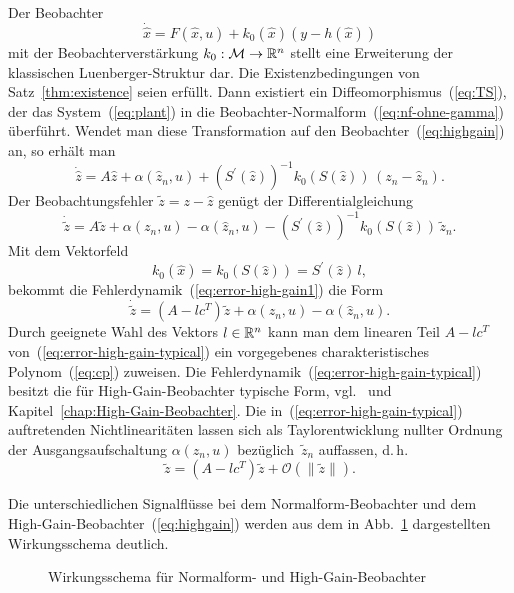 Der Beobachter 
\begin{equation}
\dot{\hat{x}}=F(\hat{x},u)+k_{0}(\hat{x})(y-h(\hat{x}))\label{eq:highgain}
\end{equation}
mit der Beobachterverstärkung $k_{0}:\mathcal{M}\to{\mathbb{R}}^{n}$ stellt
eine Erweiterung der klassischen Luenberger-Struktur dar. Die Existenzbedingungen
von Satz~\ref{thm:existence} seien erfüllt. Dann existiert ein Diffeomorphismus~(\ref{eq:TS}),
der das System~(\ref{eq:plant}) in die Beobachter-Normalform~(\ref{eq:nf-ohne-gamma})
überführt. Wendet man diese Transformation auf den Beobachter~(\ref{eq:highgain})
an, so erhält man 
\[
\dot{\hat{z}}=A\hat{z}+\alpha(\hat{z}_{n},u)+\left(S^{\prime}(\hat{z})\right)^{-1}k_{0}(S(\hat{z}))\,(z_{n}-\hat{z}_{n}).
\]
Der Beobachtungsfehler $\tilde{z}=z-\hat{z}$ genügt der Differentialgleichung
\begin{equation}
\dot{\tilde{z}}=A\tilde{z}+\alpha(z_{n},u)-\alpha(\hat{z}_{n},u)-\left(S^{\prime}(\hat{z})\right)^{-1}k_{0}(S(\hat{z}))\,\tilde{z}_{n}.\label{eq:error-high-gain1}
\end{equation}
Mit dem Vektorfeld 
\begin{equation}
k_{0}(\hat{x})=k_{0}(S(\hat{z}))=S^{\prime}(\hat{z})\,l,\label{eq:gain-hg-z}
\end{equation}
bekommt die Fehlerdynamik~(\ref{eq:error-high-gain1}) die Form 
\begin{equation}
\dot{\tilde{z}}=(A-lc^{T})\tilde{z}+\alpha(z_{n},u)-\alpha(\hat{z}_{n},u).\label{eq:error-high-gain-typical}
\end{equation}
Durch geeignete Wahl des Vektors $l\in{\mathbb{R}}^{n}$ kann man dem linearen
Teil $A-lc^{T}$ von~(\ref{eq:error-high-gain-typical}) ein vorgegebenes
charakteristisches Polynom~(\ref{eq:cp}) zuweisen. Die Fehlerdynamik~(\ref{eq:error-high-gain-typical})
besitzt die für High-Gain-Beobachter typische Form, vgl.~\cite{thau1973,raghavan1994,rajamani1998}
und Kapitel~\ref{chap:High-Gain-Beobachter}. Die in~(\ref{eq:error-high-gain-typical})
auftretenden Nichtlinearitäten lassen sich als Taylorentwicklung nullter
Ordnung der Ausgangsaufschaltung $\alpha(z_{n},u)$ bezüglich~$\tilde{z}_{n}$
auffassen, d.\,h. 
\[
\tilde{z}=(A-lc^{T})\tilde{z}+\mathcal{O}(\|\tilde{z}\|).
\]

Die unterschiedlichen Signalflüsse bei dem Normalform-Beobachter und
dem High-Gain-Beobachter~(\ref{eq:highgain}) werden aus dem in Abb.~\ref{fig:Wirkungsschemata-NF-und-High-Gain-Beobachter}
dargestellten Wirkungsschema deutlich.

\begin{figure}
\begin{centering}
\resizebox{0.75\textwidth}{!}{}
\par\end{centering}
\caption{Wirkungsschema für Normalform- und High-Gain-Beobachter\label{fig:Wirkungsschemata-NF-und-High-Gain-Beobachter}}
\end{figure}

